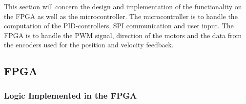 \documentclass[../../main.tex]{subfiles}
\begin{document}
This section will concern the design and implementation of the functionality on the FPGA as well as the microcontroller. The microcontroller is to handle the computation of the PID-controllers, SPI communication and user input. The FPGA is to handle the PWM signal, direction of the motors and the data from the encoders used for the position and velocity feedback. 



\subsection{FPGA} \label{subsec:SystemImplemtationFPGA}



\subsubsection*{Logic Implemented in the FPGA}
\end{document}
